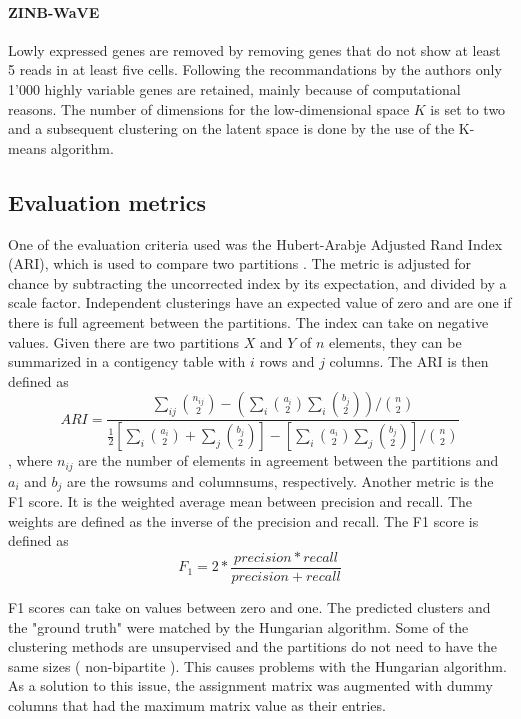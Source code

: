 \documentclass[12pt, a4paper]{article}\usepackage[]{graphicx}\usepackage[]{color}
\begin{document}
\paragraph{ZINB-WaVE}
Lowly expressed genes are removed by removing genes that do not show at least 5 reads in at least five cells. Following the recommandations by the authors only 1'000 highly variable genes are retained, mainly because of computational reasons.  
The number of dimensions for the low-dimensional space $K$ is set to two and a subsequent clustering on the latent space is done by the use of the K-means algorithm.

\subsection{Evaluation metrics}
One of the evaluation criteria used was the Hubert-Arabje Adjusted Rand Index (ARI), which is used to compare two partitions \citep{hubert1985comparing}. The metric is adjusted for chance by subtracting the uncorrected index by its expectation, and divided by a scale factor. Independent clusterings have an expected value of zero and are one if there is full agreement between the partitions. The index can take on negative values. Given there are two partitions $X$ and $Y$ of $n$ elements, they can be summarized in a contigency table with $i$ rows and $j$ columns. The ARI is then defined as
\begin{equation}
ARI=\frac{ {\sum_{ij}{n_{ij} \choose 2}-(  \sum_{i}{a_{i} \choose 2}  \sum_{i}{b_{j} \choose 2})}/{n\choose 2}} 
{ \frac{1}{2} [ \sum_{i}{a_{i} \choose 2}+\sum_{j}{b_{j} \choose 2} ]-[\sum_{i}{a_{i} \choose 2}\sum_{j}{b_{j} \choose 2}]/{n\choose 2} }
\end{equation}
, where $n_{ij}$ are the number of elements in agreement between the partitions and $a_{i}$ and $b_{j}$ are the rowsums and columnsums, respectively. 
Another metric is the F1 score. It is the weighted average mean between precision and recall. The weights are defined as the inverse of the precision and recall. The F1 score is defined as
\begin{equation}
F_{1}= 2 * \frac{precision * recall}{precision + recall}
\end{equation}

F1 scores can take on values between zero and one. The predicted clusters and the "ground truth" were matched by the Hungarian algorithm. Some of the clustering methods are unsupervised and the partitions do not need to have the same sizes ( non-bipartite ). This causes problems with the Hungarian algorithm. As a solution to this issue, the assignment matrix was augmented with dummy columns that had the maximum matrix value as their entries.
\end{document}

